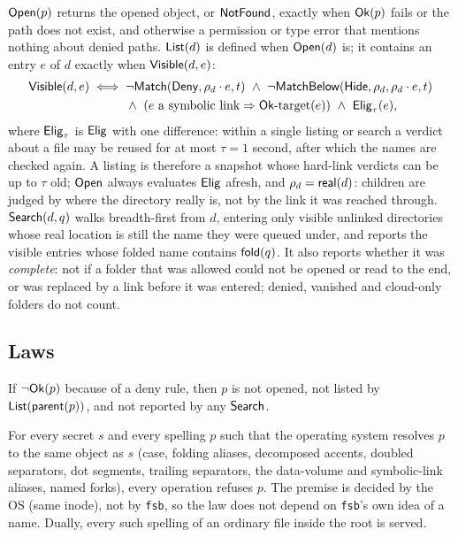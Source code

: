 \begin{definition}
$\mathsf{Open}(p)$ returns the opened object, or $\mathsf{NotFound}$, exactly when $\mathsf{Ok}(p)$
fails or the path does not exist, and otherwise a permission or type error that
mentions nothing about denied paths.  $\mathsf{List}(d)$ is defined when $\mathsf{Open}(d)$ is;
it contains an entry $e$ of $d$ exactly when $\mathsf{Visible}(d,e)$:
\begin{align*}
  \Visible(d,e)\iff{}& \neg\Match(\Deny,\rho_d\cdot e,t)\ \land\
      \neg\MatchBelow(\Hide,\rho_d,\rho_d\cdot e,t)\\
  &\land\ (e\text{ a symbolic link}\Rightarrow\Ok\text{-target}(e))\ \land\
      \Elig_\tau(e),
\end{align*}
where $\mathsf{Elig}_\tau$ is $\mathsf{Elig}$ with one difference: within a single listing or
search a verdict about a file may be reused for at most $\tau=1$ second, after
which the names are checked again.  A listing is therefore a snapshot whose
hard-link verdicts can be up to $\tau$ old; $\mathsf{Open}$ always evaluates $\mathsf{Elig}$
afresh,
and $\rho_d=\mathsf{real}(d)$: children are judged by where the directory really is,
not by the link it was reached through.  $\mathsf{Search}(d,q)$ walks breadth-first from
$d$, entering only visible unlinked directories whose real location is still the
name they were queued under, and reports the visible entries whose folded name
contains $\mathsf{fold}(q)$.  It also reports whether it was \emph{complete}: not if a
folder that was allowed could not be opened or read to the end, or was replaced by a
link before it was entered; denied, vanished and cloud-only folders do not count.
\end{definition}

\subsection{Laws}

\begin{law}
\label{law:absent}
If $\neg\mathsf{Ok}(p)$ because of a deny rule, then $p$ is not opened, not listed by
$\mathsf{List}(\mathsf{parent}(p))$, and not reported by any $\mathsf{Search}$.
\end{law}

\begin{law}
\label{law:differential}
For every secret $s$ and every spelling $p$ such that the operating system
resolves $p$ to the same object as $s$ (case, folding aliases, decomposed accents,
doubled separators, dot segments, trailing separators, the data-volume and
symbolic-link aliases, named forks), every operation refuses $p$.  The premise is
decided by the OS (same inode), not by \texttt{fsb}, so the law does not depend on
\texttt{fsb}'s own idea of a name.  Dually, every such spelling of an ordinary file
inside the root is served.
\end{law}

